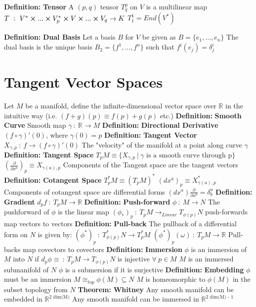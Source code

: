 \documentclass[14pt]{extarticle}
\def\Definition{{\color{blue} \textbf{Definition:} }}
\def\Theorem{{\color{red} \textbf{Theorem:} }}
\begin{document}
\begin{outline}
		\1	\Definition \textbf{Tensor}
			\2	A $(p,q)$ tensor $T^p_q$ on $V$ is a multilinear map
			\2	$T~:~V^* \cross ... \cross V^*_p \cross V \cross ... \cross V_q \rightarrow K$
			\2	$T^1_1 = End(V^*)$

		\1	\Definition \textbf{Dual Basis}
			\2	Let a basis $B$ for $V$ be given as $B = \{e_1,...,e_n\}$
			\2	The dual basis is the unique basis $B_2 = \{f^1,...,f^n\}$ such
					that $f^i(e_j) = \delta_j^i$

	\section*{Tangent Vector Spaces}
		\1	Let $M$ be a manifold, define the infinite-dimensional vector space over
				$\mathbb{R}$ in the intuitive way (i.e. $(f+g)(p) \equiv f(p) + g(p)$ etc.)
		\1	\Definition \textbf{Smooth Curve}
			\2	Smooth map $\gamma~:~\mathbb{R} \rightarrow M$
			\2	\Definition \textbf{Directional Derivative} 
				\3	$(f \circ \gamma)'(0)$, where $\gamma(0) = p$
			\2	\Definition \textbf{Tangent Vector}
				\3	$X_{\gamma,p} ~:~f \rightarrow (f \circ \gamma)'(0)$
				\3	The "velocity" of the manifold at a point along curve $\gamma$
		\1	\Definition \textbf{Tangent Space}
			\2	$T_pM \equiv \{X_{\gamma,p}~|~\gamma \text{ is a smooth curve through p}\}$
			\2	$(\frac{\partial}{\partial x^a})_p \equiv X_{\gamma(a),p}$
				\3	Components of the Tangent space are the tangent vectors
		\1	\Definition \textbf{Cotangent Space}
			\2	$T_p^*M \equiv (T_pM)^*$
			\2	$(dx^a)_p \equiv X^*_{\gamma(a),p}$
				\3	Components of cotangent space are differential forms
			\2	$(dx^a) \frac{\partial}{\partial x^b} = \delta_b^a$
		\1	\Definition \textbf{Gradient}
			\2	$d_p f~:~T_pM \rightarrow \mathbb{R}$
		\1	\Definition \textbf{Push-forward}
			\2	$\phi~:~M \rightarrow N$
			\2	The pushforward of $\phi$ is the linear map
					$(\phi_*)_p~:~T_pM \rightarrow_{Linear} T_{\phi(p)}N$
			\2	push-forwards map vectors to vectors
		\1	\Definition \textbf{Pull-back}
			\2	The pullback of a differential form on $N$ is given by:
				\3	$(\phi^*)_p ~:~T^*_{\phi(p)}N \rightarrow T_p^*M$
				\3	$(\phi^*)_p(\omega)~:~T_pM \rightarrow \mathbb{R}$
			\2	Pull-backs map covectors to covectors
		\1	\Definition \textbf{Immersion}
			\2	$\phi$ is an immersion of $M$ into $N$ if $d_p\phi \equiv ~:~T_pM \rightarrow T_{\phi(p)}N$
					is injective $\forall~p \in M$
			\2	$M$ is an immersed submanifold of $N$
			\2	$\phi$ is a submersion if it is surjective
		\1	\Definition \textbf{Embedding}
			\2	$\phi$ must be an immersion
			\2	$M \cong_{top} \phi(M) \subseteq N$
			\2	$M$ is homeomorphic to $\phi(M)$ in the subset topology from $N$	
		\1	\Theorem \textbf{Whitney}
			\2	Any smooth manifold can be embedded in $\mathbb{R}^{\text{2 dim(M)}}$
			\2	Any smooth manifold can be immersed in $\mathbb{R}^{\text{2 dim(M) - 1}}$
		

\end{outline}
\end{document}
